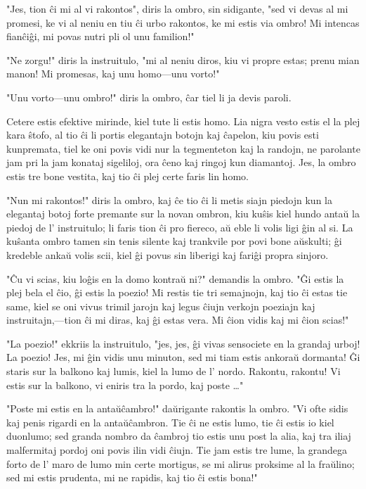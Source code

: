 \documentclass[ngerman,12pt,twoside]{book}
\begin{document}
"Jes, tion ĉi mi al vi rakontos", diris la ombro, sin sidigante, "sed vi devas al mi promesi, ke vi al neniu en tiu ĉi urbo rakontos, ke mi estis via ombro! Mi intencas fianĉiĝi, mi povas nutri pli ol unu familion!"

"Ne zorgu!" diris la instruitulo, "mi al neniu diros, kiu vi propre estas; prenu mian manon! Mi promesas, kaj unu homo---unu vorto!"

"Unu vorto---unu ombro!" diris la ombro, ĉar tiel li ja devis paroli.

Cetere estis efektive mirinde, kiel tute li estis homo. Lia nigra vesto estis el la plej kara ŝtofo, al tio ĉi li portis elegantajn botojn kaj ĉapelon, kiu povis esti kunpremata, tiel ke oni povis vidi nur la tegmenteton kaj la randojn, ne parolante jam pri la jam konataj sigeliloj, ora ĉeno kaj ringoj kun diamantoj. Jes, la ombro estis tre bone vestita, kaj tio ĉi plej certe faris lin homo.

"Nun mi rakontos!" diris la ombro, kaj ĉe tio ĉi li metis siajn piedojn kun la elegantaj botoj forte premante sur la novan ombron, kiu kuŝis kiel hundo antaŭ la piedoj de l' instruitulo; li faris tion ĉi pro fiereco, aŭ eble li volis ligi ĝin al si. La kuŝanta ombro tamen sin tenis silente kaj trankvile por povi bone aŭskulti; ĝi kredeble ankaŭ volis scii, kiel ĝi povus sin liberigi kaj fariĝi propra sinjoro.

"Ĉu vi scias, kiu loĝis en la domo kontraŭ ni?" demandis la ombro. "Ĝi estis la plej bela el ĉio, ĝi estis la poezio! Mi restis tie tri semajnojn, kaj tio ĉi estas tie same, kiel se oni vivus trimil jarojn kaj legus ĉiujn verkojn poeziajn kaj instruitajn,---tion ĉi mi diras, kaj ĝi estas vera. Mi ĉion vidis kaj mi ĉion scias!"

"La poezio!" ekkriis la instruitulo, "jes, jes, ĝi vivas sensociete en la grandaj urboj! La poezio! Jes, mi ĝin vidis unu minuton, sed mi tiam estis ankoraŭ dormanta! Ĝi staris sur la balkono kaj lumis, kiel la lumo de l' nordo. Rakontu, rakontu! Vi estis sur la balkono, vi eniris tra la pordo, kaj poste \ldots{}"

"Poste mi estis en la antaŭĉambro!" daŭrigante rakontis la ombro. "Vi ofte sidis kaj penis rigardi en la antaŭĉambron. Tie ĉi ne estis lumo, tie ĉi estis io kiel duonlumo; sed granda nombro da ĉambroj tio estis unu post la alia, kaj tra iliaj malfermitaj pordoj oni povis ilin vidi ĉiujn. Tie jam estis tre lume, la grandega forto de l' maro de lumo min certe mortigus, se mi alirus proksime al la fraŭlino; sed mi estis prudenta, mi ne rapidis, kaj tio ĉi estis bona!"
\end{document}
